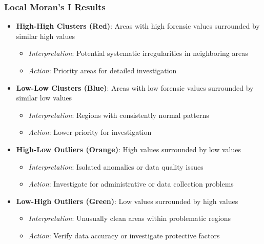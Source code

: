 \documentclass{article}
\begin{document}
\subsubsection{Local Moran's I Results}
\begin{itemize}
    \item \textbf{High-High Clusters (Red)}: Areas with high forensic values surrounded by similar high values
    \begin{itemize}
        \item \textit{Interpretation}: Potential systematic irregularities in neighboring areas
        \item \textit{Action}: Priority areas for detailed investigation
    \end{itemize}
    
    \item \textbf{Low-Low Clusters (Blue)}: Areas with low forensic values surrounded by similar low values
    \begin{itemize}
        \item \textit{Interpretation}: Regions with consistently normal patterns
        \item \textit{Action}: Lower priority for investigation
    \end{itemize}
    
    \item \textbf{High-Low Outliers (Orange)}: High values surrounded by low values
    \begin{itemize}
        \item \textit{Interpretation}: Isolated anomalies or data quality issues
        \item \textit{Action}: Investigate for administrative or data collection problems
    \end{itemize}
    
    \item \textbf{Low-High Outliers (Green)}: Low values surrounded by high values
    \begin{itemize}
        \item \textit{Interpretation}: Unusually clean areas within problematic regions
        \item \textit{Action}: Verify data accuracy or investigate protective factors
    \end{itemize}
\end{itemize}
\end{document}
